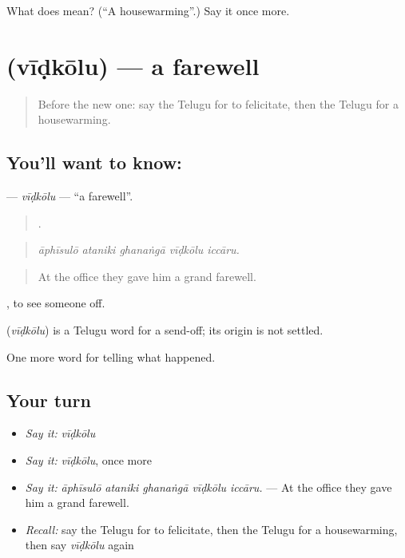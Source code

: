 \begin{tcolorbox}[breakable,colback=teal!4,colframe=teal!35!black,title={Before you move on}]
What does  mean? (\textquotedblleft{}A housewarming\textquotedblright{}.) Say it once more.
\end{tcolorbox}
\section[\texorpdfstring{\te{వీడ్కోలు} (vīḍkōlu)}{వీడ్కోలు (vīḍkōlu)}]{ (vīḍkōlu) — a farewell}

\label{lesson:TE-C356-vidkolu}



\begin{quote}
Before the new one: say the Telugu for to felicitate, then the Telugu for a housewarming.
\end{quote}

\subsection*{You'll want to know: }
\textbf{} — \emph{vīḍkōlu} — \textquotedblleft{}a farewell\textquotedblright{}.

\begin{quote}
    .
\end{quote}

\begin{quote}
\emph{āphīsulō ataniki ghanaṅgā vīḍkōlu iccāru.}
\end{quote}

\begin{quote}
At the office they gave him a grand farewell.
\end{quote}

 , to see someone off.

\begin{cousinweb}
\textbf{} (\emph{vīḍkōlu}) is a Telugu word for a send-off; its origin is not settled.
\end{cousinweb}

\begin{grammarlens}[title={What you've built}]
One more word for telling what happened.
\end{grammarlens}

\subsection*{Your turn}
\begin{itemize}
\raggedright
  \item \emph{Say it:} \emph{vīḍkōlu}
  \item \emph{Say it:} \emph{vīḍkōlu}, once more
  \item \emph{Say it:} \emph{āphīsulō ataniki ghanaṅgā vīḍkōlu iccāru.} — At the office they gave him a grand farewell.
  \item \emph{Recall:} say the Telugu for to felicitate, then the Telugu for a housewarming, then say \emph{vīḍkōlu} again
\end{itemize}

